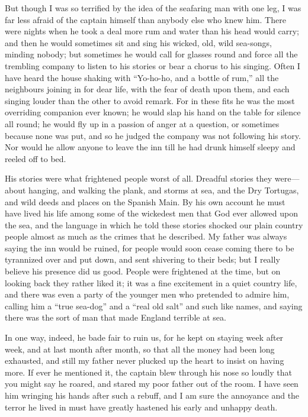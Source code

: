 But though I was so terrified by the idea of the seafaring man with one leg, I was far less afraid of the captain himself than anybody else who knew him. There were nights when he took a deal more rum and water than his head would carry; and then he would sometimes sit and sing his wicked, old, wild sea-songs, minding nobody; but sometimes he would call for glasses round and force all the trembling company to listen to his stories or bear a chorus to his singing. Often I have heard the house shaking with \enquote{Yo-ho-ho, and a bottle of rum,} all the neighbours joining in for dear life, with the fear of death upon them, and each singing louder than the other to avoid remark. For in these fits he was the most overriding companion ever known; he would slap his hand on the table for silence all round; he would fly up in a passion of anger at a question, or sometimes because none was put, and so he judged the company was not following his story. Nor would he allow anyone to leave the inn till he had drunk himself sleepy and reeled off to bed.

His stories were what frightened people worst of all. Dreadful stories they were---about hanging, and walking the plank, and storms at sea, and the Dry Tortugas, and wild deeds and places on the Spanish Main. By his own account he must have lived his life among some of the wickedest men that God ever allowed upon the sea, and the language in which he told these stories shocked our plain country people almost as much as the crimes that he described. My father was always saying the inn would be ruined, for people would soon cease coming there to be tyrannized over and put down, and sent shivering to their beds; but I really believe his presence did us good. People were frightened at the time, but on looking back they rather liked it; it was a fine excitement in a quiet country life, and there was even a party of the younger men who pretended to admire him, calling him a \enquote{true sea-dog} and a \enquote{real old salt} and such like names, and saying there was the sort of man that made England terrible at sea.

In one way, indeed, he bade fair to ruin us, for he kept on staying week after week, and at last month after month, so that all the money had been long exhausted, and still my father never plucked up the heart to insist on having more. If ever he mentioned it, the captain blew through his nose so loudly that you might say he roared, and stared my poor father out of the room. I have seen him wringing his hands after such a rebuff, and I am sure the annoyance and the terror he lived in must have greatly hastened his early and unhappy death.

